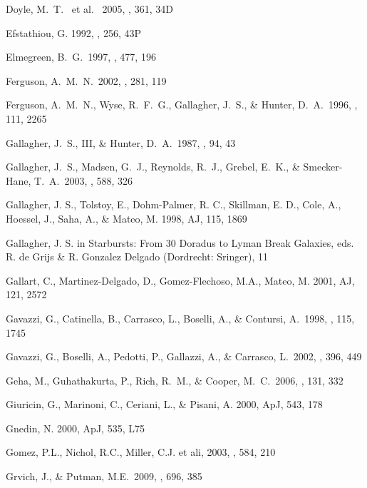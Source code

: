 \documentclass[12pt,preprint]{emulateapj}
\begin{document}
\begin{thebibliography}{}
Doyle, M.~T. ~et al. \ 2005, \mnras, 361, 34D 

Efstathiou, G. 1992, \mnras, 256, 43P 

Elmegreen, B.~G.\ 1997, \apj, 477, 196 

Ferguson, A.~M.~N.\ 2002, \apss, 281, 119 

Ferguson, A.~M.~N., Wyse, R.~F.~G., Gallagher, J.~S., \& Hunter, D.~A.\ 
1996, \aj, 111, 2265 

Gallagher, J.~S., III, \& Hunter, D.~A.\ 1987, \aj, 94, 43 

Gallagher, J.~S., Madsen, G.~J., Reynolds, R.~J., Grebel, E.~K., \& 
    Smecker-Hane, T.~A.\ 2003, \apj, 588, 326 

Gallagher, J. S., Tolstoy, E., Dohm-Palmer, R. C., Skillman, E. D., Cole, A., 
Hoessel, J., Saha, A., \& Mateo, M. 1998, AJ, 115, 1869

Gallagher, J. S. in Starbursts: From 30 Doradus to Lyman Break Galaxies,
eds. R. de Grijs \& R. Gonzalez Delgado (Dordrecht: Sringer), 11

Gallart, C., Martinez-Delgado, D., Gomez-Flechoso, M.A., Mateo, M. 2001, AJ, 121, 2572

Gavazzi, G., Catinella, B., Carrasco, L., Boselli, A., \& Contursi, A.\ 
1998, \aj, 115, 1745 

Gavazzi, G., Boselli, A., Pedotti, P., Gallazzi, A., \& Carrasco, L.\ 
2002, \aap, 396, 449 

\bibitem[Geha et al.(2006)]{ggrc06} 
Geha, M., Guhathakurta, P., Rich, R.~M., \& Cooper, M.~C.\ 2006, \aj, 131, 332 

Giuricin, G., Marinoni, C., Ceriani, L., \& Pisani, A. 2000, ApJ, 543, 178

\bibitem[Gnedin (2000)]{g00}
Gnedin, N. 2000, ApJ, 535, L75

Gomez, P.L., Nichol, R.C., Miller, C.J. et ali, 2003, \apj, 584, 210

Grvich, J., \& Putman, M.E.\ 2009, \apj, 696, 385


\end{thebibliography}
\end{document}
